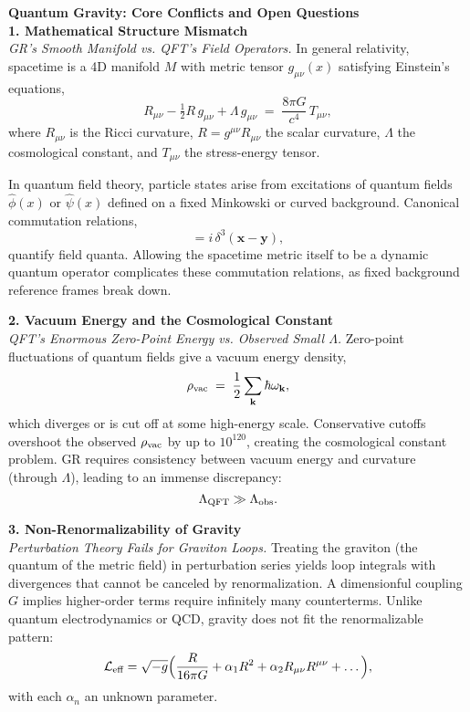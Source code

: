 
\begin{technical}
    {\Large\textbf{Quantum Gravity: Core Conflicts and Open Questions}}\\[0.7em]

    \noindent\textbf{1. Mathematical Structure Mismatch}\\[0.5em]
    \textit{GR's Smooth Manifold vs. QFT's Field Operators.}
    In general relativity, spacetime is a 4D manifold $M$ with metric tensor $g_{\mu\nu}(x)$ satisfying Einstein's equations,
    \begin{equation}
        R_{\mu\nu} - \tfrac{1}{2}R\,g_{\mu\nu} + \Lambda\,g_{\mu\nu} \;=\; \frac{8\pi G}{c^4}\,T_{\mu\nu},
    \end{equation}
    where $R_{\mu\nu}$ is the Ricci curvature, $R = g^{\mu\nu}R_{\mu\nu}$ the scalar curvature, $\Lambda$ the cosmological constant, and $T_{\mu\nu}$ the stress-energy tensor. 

    In quantum field theory, particle states arise from excitations of quantum fields $\hat{\phi}(x)$ or $\hat{\psi}(x)$ defined on a fixed Minkowski or curved background. Canonical commutation relations,
    \begin{equation}
        [\hat{\phi}(t,\mathbf{x}),\,\hat{\pi}(t,\mathbf{y})] = i\,\delta^3(\mathbf{x}-\mathbf{y}),
    \end{equation}
    quantify field quanta. Allowing the spacetime metric itself to be a dynamic quantum operator complicates these commutation relations, as fixed background reference frames break down.

    \noindent\textbf{2. Vacuum Energy and the Cosmological Constant}\\[0.5em]
    \textit{QFT's Enormous Zero-Point Energy vs. Observed Small $\Lambda$.}
    Zero-point fluctuations of quantum fields give a vacuum energy density,
    \begin{equation}
        \rho_{\rm vac} \;=\; \frac{1}{2}\sum_{\mathbf{k}}\hbar\omega_{\mathbf{k}},
    \end{equation}
    which diverges or is cut off at some high-energy scale. Conservative cutoffs overshoot the observed $\rho_{\rm vac}$ by up to $10^{120}$, creating the cosmological constant problem. GR requires consistency between vacuum energy and curvature (through $\Lambda$), leading to an immense discrepancy:
    \[
        \Lambda_{\rm QFT} \gg \Lambda_{\rm obs}.
    \]

    \noindent\textbf{3. Non-Renormalizability of Gravity}\\[0.5em]
    \textit{Perturbation Theory Fails for Graviton Loops.}
    Treating the graviton (the quantum of the metric field) in perturbation series yields loop integrals with divergences that cannot be canceled by renormalization. A dimensionful coupling $G$ implies higher-order terms require infinitely many counterterms. Unlike quantum electrodynamics or QCD, gravity does not fit the renormalizable pattern:
    \[
        \mathcal{L}_\text{eff} = \sqrt{-g}\Bigl(\frac{R}{16\pi G} + \alpha_1 R^2 + \alpha_2 R_{\mu\nu}R^{\mu\nu} + \dots\Bigr),
    \]
    with each $\alpha_n$ an unknown parameter.


\end{technical}
